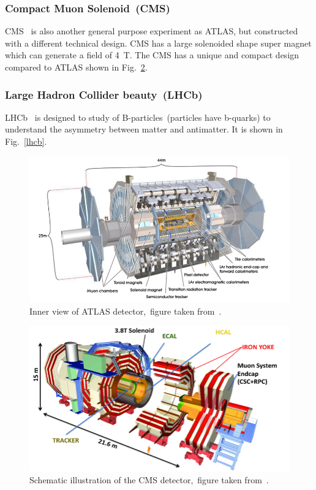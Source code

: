 \subsubsection{Compact Muon Solenoid~(CMS)}
CMS~\cite{Collaboration_2008cms} is also another general purpose experiment as ATLAS, but constructed with a different technical design. CMS has a large solenoided shape super magnet which can generate a field of 4~T. The CMS has a unique and compact design compared to ATLAS shown in Fig.~\ref{cms1}.


\subsubsection{Large Hadron Collider beauty~(LHCb)}
LHCb~\cite{Collaboration_2008lhcb} is designed to study of B-particles~(particles have b-quarks) to understand the asymmetry between matter and antimatter. It is shown in Fig.~\ref{lhcb}.



\begin{figure}[H]
\centering
\includegraphics[scale=0.5]{chapter2/ATLAS.png}
\caption{Inner view of ATLAS detector,~figure taken from~\cite{Schott_2014}.}
\label{ATLAS_VIEW}
\end{figure} 

\begin{figure}[H]
\centering
\includegraphics[scale=0.5]{chapter2/cms.png}
\caption{Schematic illustration of the CMS detector,~figure taken from~\cite{article11}.}
\label{cms1}
\end{figure}


